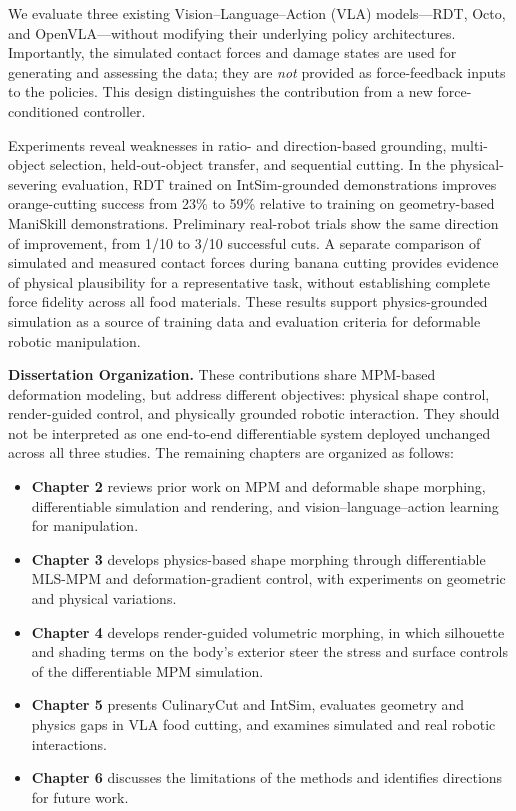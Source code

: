     We evaluate three existing Vision--Language--Action (VLA) models---RDT, Octo, and OpenVLA---without modifying their underlying policy architectures. Importantly, the simulated contact forces and damage states are used for generating and assessing the data; they are \emph{not} provided as force-feedback inputs to the policies. This design distinguishes the contribution from a new force-conditioned controller.
    
    Experiments reveal weaknesses in ratio- and direction-based grounding, multi-object selection, held-out-object transfer, and sequential cutting. In the physical-severing evaluation, RDT trained on IntSim-grounded demonstrations improves orange-cutting success from 23\% to 59\% relative to training on geometry-based ManiSkill demonstrations. Preliminary real-robot trials show the same direction of improvement, from 1/10 to 3/10 successful cuts. A separate comparison of simulated and measured contact forces during banana cutting provides evidence of physical plausibility for a representative task, without establishing complete force fidelity across all food materials. These results support physics-grounded simulation as a source of training data and evaluation criteria for deformable robotic manipulation.

\noindent\textbf{Dissertation Organization.}
    These contributions share MPM-based deformation modeling, but address different objectives: physical shape control, render-guided control, and physically grounded robotic interaction. They should not be interpreted as one end-to-end differentiable system deployed unchanged across all three studies. The remaining chapters are organized as follows:
    \begin{itemize}
        \item \textbf{Chapter 2} reviews prior work on MPM and deformable shape morphing, differentiable simulation and rendering, and vision--language--action learning for manipulation.
        \item \textbf{Chapter 3} develops physics-based shape morphing through differentiable MLS-MPM and deformation-gradient control, with experiments on geometric and physical variations.
        \item \textbf{Chapter 4} develops render-guided volumetric morphing, in which silhouette and shading terms on the body's exterior steer the stress and surface controls of the differentiable MPM simulation.
        \item \textbf{Chapter 5} presents CulinaryCut and IntSim, evaluates geometry and physics gaps in VLA food cutting, and examines simulated and real robotic interactions.
        \item \textbf{Chapter 6} discusses the limitations of the methods and identifies directions for future work.
    \end{itemize}
    